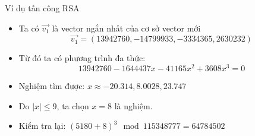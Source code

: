 \begin{frame}{Ví dụ tấn công RSA}

\begin{itemize}
\item Ta có $\vec{v_1}$ là vector ngắn nhất của cơ sở vector mới
\[
\vec{v_1} = (13942760, -14799933, -3334365, 2630232)
\]
\item Từ đó ta có phương trình đa thức:
\[
13942760 - 1644437x - 41165x^2 + 3608x^3 = 0
\]
\item Nghiệm tìm được: $x \approx -20.314, 8.0028, 23.747$
\item Do $|x| \leq 9$, ta chọn $x = 8$ là nghiệm.
\item Kiểm tra lại: $(5180+8)^3 \mod 115348777 = 64784502$
\end{itemize}

\end{frame}
